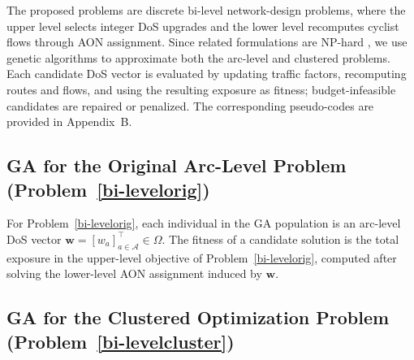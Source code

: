 \documentclass[lettersize,journal]{IEEEtran}
\begin{document}
The proposed problems are discrete bi-level network-design problems, where the
upper level selects integer DoS upgrades and the lower level recomputes cyclist
flows through AON assignment. Since related formulations are NP-hard
\cite{jurado2025graph}, we use genetic algorithms to approximate both the
arc-level and clustered problems. Each candidate DoS vector is evaluated by
updating traffic factors, recomputing routes and flows, and using the resulting
exposure as fitness; budget-infeasible candidates are repaired or penalized. The
corresponding pseudo-codes are provided in Appendix~B.


\subsection{GA for the Original Arc-Level Problem (Problem~\ref{bi-levelorig})}

For Problem~\ref{bi-levelorig}, each individual in the GA population is an
arc-level DoS vector $
\mathbf{w}
=
\left[
w_a
\right]_{a\in\mathcal{A}}^\top
\in
\Omega.$ The fitness of a candidate solution is the total exposure in the upper-level
objective of Problem~\ref{bi-levelorig}, computed after solving the lower-level
AON assignment induced by $\mathbf{w}$.



\subsection{GA for the Clustered Optimization Problem (Problem~\ref{bi-levelcluster})}
\end{document}
